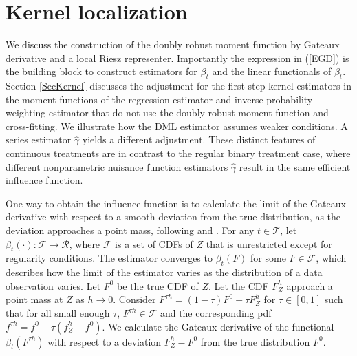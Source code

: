 \documentclass[lettersize, 12pt]{article}
\begin{document}
{\section{Kernel localization}
\label{SecM}
We discuss the construction of the doubly robust moment function
by Gateaux derivative and a local Riesz representer.
Importantly the expression in (\ref{EGD}) is the building block to construct estimators for $\beta_t$ and the linear functionals of $\beta_t$.
Section \ref{SecKernel}
discusses the adjustment for the first-step kernel estimators in the moment functions of the regression estimator and inverse probability weighting estimator that do not use the doubly robust moment function and cross-fitting. 
We illustrate how the DML estimator assumes weaker conditions.
A series estimator $\hat \gamma$ yields a different adjustment.
These distinct features of continuous treatments are in contrast to the regular binary treatment case, where different nonparametric nuisance function estimators $\hat\gamma$ result in the same efficient influence function.


One way to obtain the influence function
 is to calculate the limit of the Gateaux derivative with respect to a smooth deviation from the true distribution, as the deviation approaches a point mass, following \cite{CLV} and \cite{IchimuraNewey22QE}.
For any $t\in\mathcal{T}$, let $\beta_t(\cdot): \mathcal{F} \rightarrow \mathcal{R}$, where $\mathcal{F}$ is a set of CDFs of $Z$ that is unrestricted except for regularity conditions. 
The estimator converges to $\beta_t(F)$ for some $F \in \mathcal{F}$, which describes how the limit of the estimator varies as the distribution of a data observation varies. 
Let $F^0$ be the true CDF of $Z$.
Let the CDF $F_Z^h$  approach a point mass at $Z$ as $h \rightarrow 0$. 
Consider $F^{\tau h} = (1-\tau) F^0 + \tau F_Z^h$ for $\tau \in [0,1]$ such that for all small enough $\tau$, $F^{\tau h} \in \mathcal{F}$
and the corresponding pdf $f^{\tau h} = f^0 + \tau(f_Z^h - f^0)$.
We calculate the Gateaux derivative of the functional $\beta_t(F^{\tau h})$ with respect to a deviation $F_Z^h - F^0$ from the true distribution $F^0$.

}
\end{document}
